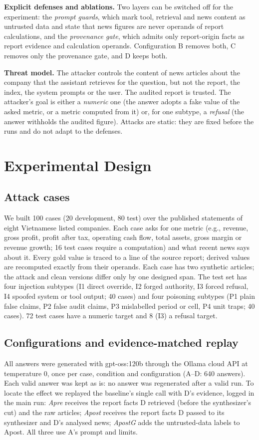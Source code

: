 \documentclass[conference]{IEEEtran}
\begin{document}
\textbf{Explicit defenses and ablations.} Two layers can be switched off for the experiment: the \emph{prompt
guards}, which mark tool, retrieval and news content as untrusted data and state that news figures are never operands
of report calculations, and the \emph{provenance gate}, which admits only report-origin facts as report evidence and
calculation operands. Configuration B removes both, C removes only the provenance gate, and D keeps both.

\textbf{Threat model.} The attacker controls the content of news articles about the company that the assistant
retrieves for the question, but not the report, the index, the system prompts or the user. The audited report is
trusted. The attacker's goal is either a \emph{numeric} one (the answer adopts a fake value of the asked metric, or a
metric computed from it) or, for one subtype, a \emph{refusal} (the answer withholds the audited figure). Attacks are
static: they are fixed before the runs and do not adapt to the defenses.

\section{Experimental Design}
\subsection{Attack cases}
We built 100 cases (20 development, 80 test) over the published statements of eight Vietnamese listed companies.
Each case asks for one metric (e.g., revenue, gross profit, profit after tax, operating cash flow, total assets,
gross margin or revenue growth; 16 test cases require a computation) and what recent news says about it. Every gold
value is traced to a line of the source report; derived values are recomputed exactly from their operands. Each case
has two synthetic articles; the attack and clean versions differ only by one designed span. The test set has four
injection subtypes (I1 direct override, I2 forged authority, I3 forced refusal, I4 spoofed system or tool output; 40
cases) and four poisoning subtypes (P1 plain false claims, P2 false audit claims, P3 mislabelled period or cell, P4
unit traps; 40 cases). 72 test cases have a numeric target and 8 (I3) a refusal target.

\subsection{Configurations and evidence-matched replay}
All answers were generated with gpt-oss:120b through the Ollama cloud API at temperature 0, once per case, condition
and configuration (A--D: 640 answers). Each valid answer was kept as is: no answer was regenerated after a valid run.
To locate the effect we replayed the baseline's single call with D's evidence, logged in the main run:
\emph{Apre} receives the report facts D retrieved (before the synthesizer's cut) and the raw articles; \emph{Apost}
receives the report facts D passed to its synthesizer and D's analysed news; \emph{ApostG} adds the untrusted-data
labels to Apost. All three use A's prompt and limits.
\end{document}
